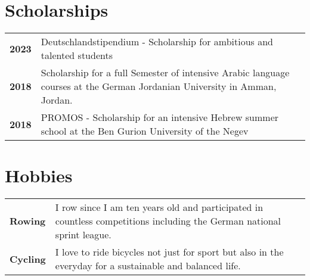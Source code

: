 \documentclass{style/modernsimplecv}
\newlength{\rightcolwidth}
\begin{document}
\begin{paracol}{2}
\begin{minipage}[t]{\rightcolwidth}
\begin{minipage}[t]{\rightcolwidth}
        \section*{Scholarships}
        \begin{tabular}{>{\bfseries}p{} >{}p{}}
            2023 & Deutschlandstipendium - Scholarship for ambitious and talented students                                                  \\
            2018 & Scholarship for a full Semester of intensive Arabic language courses at the German Jordanian University in Amman, Jordan. \\
            2018 & PROMOS -  Scholarship for an intensive Hebrew summer school at the Ben Gurion University of the Negev                     \\
        \end{tabular}
    \end{minipage}\hfill
    \bigskip
    \begin{minipage}[t]{\rightcolwidth}
        \section*{Hobbies}
        \begin{tabular}{>{\bfseries}p{} >{}p{}}
            Rowing  & I row since I am ten years old and participated in countless competitions including the German national sprint league. \\
            Cycling & I love to ride bicycles not just for sport but also in the everyday for a sustainable and balanced life.
        \end{tabular}
    \end{minipage}
\end{minipage}
\end{paracol}
\end{document}
